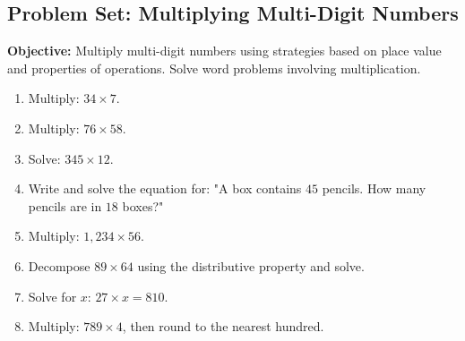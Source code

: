 \documentclass[12pt]{article}
\title{}
\date{}
\begin{document}
\subsection*{Problem Set: Multiplying Multi-Digit Numbers}
\onehalfspacing

\begin{tcolorbox}[colframe=black!40, colback=gray!5, 
coltitle=black, colbacktitle=black!20, fonttitle=\bfseries\Large, 
title=Learning Objective, halign title=center, left=5pt, right=5pt, top=5pt, bottom=15pt]
\textbf{Objective:} Multiply multi-digit numbers using strategies based on place value and properties of operations. Solve word problems involving multiplication.
\end{tcolorbox}

\begin{tcolorbox}[colframe=black!60, colback=white, 
coltitle=black, colbacktitle=black!15, fonttitle=\bfseries\Large, 
title=Exercises, halign title=center, left=10pt, right=10pt, top=10pt, bottom=60pt]
\begin{enumerate}[itemsep=3em]
    \item Multiply: \( 34 \times 7 \).
    \item Multiply: \( 76 \times 58 \).
    \item Solve: \( 345 \times 12 \).
    \item Write and solve the equation for: "A box contains \( 45 \) pencils. How many pencils are in \( 18 \) boxes?"
    \item Multiply: \( 1,234 \times 56 \).
    \item Decompose \( 89 \times 64 \) using the distributive property and solve.
    \item Solve for \( x \): \( 27 \times x = 810 \).
    \item Multiply: \( 789 \times 4 \), then round to the nearest hundred.
\end{enumerate}
\end{tcolorbox}

\vspace{1em}
\end{document}
